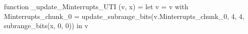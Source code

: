 function _update_Minterrupts_UTI (v, x) = let v = { v with Minterrupts_chunk_0 = update_subrange_bits(v.Minterrupts_chunk_0, 4, 4, subrange_bits(x, 0, 0)) } in
  v
